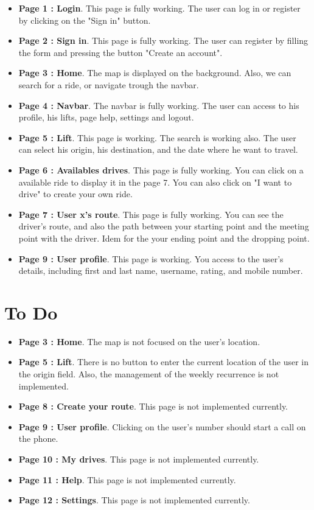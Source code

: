 \begin{itemize}
	\item {\bf Page 1 : Login}. This page is fully working. The user can log in or register by clicking on the "Sign in" button.
	\item {\bf Page 2 : Sign in}. This page is fully working. The user can register by filling the form and pressing the button "Create an account".
	\item {\bf Page 3 : Home}. The map is displayed on the background. Also, we can search for a ride, or navigate trough the navbar.
	\item {\bf Page 4 : Navbar}. The navbar is fully working. The user can access to his profile, his lifts, page help, settings and logout.
	\item {\bf Page 5 : Lift}. This page is working. The search is working also. The user can select his origin, his destination, and the date where he want to travel.
	\item {\bf Page 6 : Availables drives}. This page is fully working. You can click on a available ride to display it in the page 7. You can also click on "I want to drive" to create your own ride.
	\item {\bf Page 7 : User x's route}. This page is fully working. You can see the driver's route, and also the path between your starting point and the meeting point with the driver. Idem for the your ending point and the dropping point.
	\item {\bf Page 9 : User profile}. This page is working. You access to the user's details, including first and last name, username, rating, and mobile number.
\end{itemize}

\section{To Do}
\begin{itemize}
\item {\bf Page 3 : Home}. The map is not focused on the user's location.
\item {\bf Page 5 : Lift}. There is no button to enter the current location of the user in the origin field. Also, the management of the weekly recurrence is not implemented.
	\item {\bf Page 8 : Create your route}. This page is not implemented currently.
	\item {\bf Page 9 : User profile}. Clicking on the user's number should start a call on the phone.
	 \item {\bf Page 10 : My drives}. This page is not implemented currently.
	 \item {\bf Page 11 : Help}. This page is not implemented currently.
	 \item {\bf Page 12 : Settings}. This page is not implemented currently.
\end{itemize}